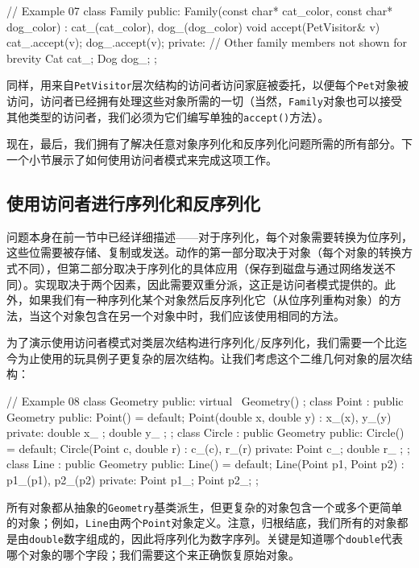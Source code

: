 \begin{code}
// Example 07
class Family {
  public:
  Family(const char* cat_color, const char* dog_color) :
  cat_(cat_color), dog_(dog_color) {}
  void accept(PetVisitor& v) {
    cat_.accept(v);
    dog_.accept(v);
  }
  private: // Other family members not shown for brevity
  Cat cat_;
  Dog dog_;
};
\end{code}

同样，用来自\texttt{PetVisitor}层次结构的访问者访问家庭被委托，以便每个\texttt{Pet}对象被访问，访问者已经拥有处理这些对象所需的一切（当然，\texttt{Family}对象也可以接受其他类型的访问者，我们必须为它们编写单独的\texttt{accept()}方法）。

现在，最后，我们拥有了解决任意对象序列化和反序列化问题所需的所有部分。下一个小节展示了如何使用访问者模式来完成这项工作。

\subsection{使用访问者进行序列化和反序列化}

问题本身在前一节中已经详细描述——对于序列化，每个对象需要转换为位序列，这些位需要被存储、复制或发送。动作的第一部分取决于对象（每个对象的转换方式不同），但第二部分取决于序列化的具体应用（保存到磁盘与通过网络发送不同）。实现取决于两个因素，因此需要双重分派，这正是访问者模式提供的。此外，如果我们有一种序列化某个对象然后反序列化它（从位序列重构对象）的方法，当这个对象包含在另一个对象中时，我们应该使用相同的方法。

为了演示使用访问者模式对类层次结构进行序列化/反序列化，我们需要一个比迄今为止使用的玩具例子更复杂的层次结构。让我们考虑这个二维几何对象的层次结构：

\begin{code}
// Example 08
class Geometry {
  public:
  virtual ~Geometry() {}
};
class Point : public Geometry {
  public:
  Point() = default;
  Point(double x, double y) : x_(x), y_(y) {}
  private:
  double x_ {};
  double y_ {};
};
class Circle : public Geometry {
  public:
  Circle() = default;
  Circle(Point c, double r) : c_(c), r_(r) {}
  private:
  Point c_;
  double r_ {};
};
class Line : public Geometry {
  public:
  Line() = default;
  Line(Point p1, Point p2) : p1_(p1), p2_(p2) {}
  private:
  Point p1_;
  Point p2_;
};
\end{code}

所有对象都从抽象的\texttt{Geometry}基类派生，但更复杂的对象包含一个或多个更简单的对象；例如，\texttt{Line}由两个\texttt{Point}对象定义。注意，归根结底，我们所有的对象都是由\texttt{double}数字组成的，因此将序列化为数字序列。关键是知道哪个\texttt{double}代表哪个对象的哪个字段；我们需要这个来正确恢复原始对象。

